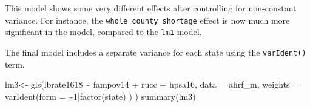 \documentclass[
  letterpaper,
  DIV=11,
  numbers=noendperiod]{scrreprt}
\newenvironment{Shaded}{\begin{snugshade}}{\end{snugshade}}
\newcommand{\AttributeTok}[1]{\textcolor[rgb]{0.40,0.45,0.13}{#1}}
\newcommand{\DecValTok}[1]{\textcolor[rgb]{0.68,0.00,0.00}{#1}}
\newcommand{\FunctionTok}[1]{\textcolor[rgb]{0.28,0.35,0.67}{#1}}
\newcommand{\NormalTok}[1]{\textcolor[rgb]{0.00,0.23,0.31}{#1}}
\newcommand{\OtherTok}[1]{\textcolor[rgb]{0.00,0.23,0.31}{#1}}
\newcommand{\SpecialCharTok}[1]{\textcolor[rgb]{0.37,0.37,0.37}{#1}}
\begin{document}
This model shows some very different effects after controlling for
non-constant variance. For instance, the
\texttt{whole\ county\ shortage} effect is now much more significant in
the model, compared to the \texttt{lm1} model.

The final model includes a separate variance for each state using the
\texttt{varIdent()} term.

\begin{Shaded}
\begin{Highlighting}[]
\NormalTok{lm3}\OtherTok{\textless{}{-}} \FunctionTok{gls}\NormalTok{(lbrate1618 }\SpecialCharTok{\textasciitilde{}}\NormalTok{  fampov14 }\SpecialCharTok{+}\NormalTok{ rucc }\SpecialCharTok{+}\NormalTok{ hpsa16,}
          \AttributeTok{data =}\NormalTok{ ahrf\_m, }
          \AttributeTok{weights =} \FunctionTok{varIdent}\NormalTok{(}\AttributeTok{form =} \SpecialCharTok{\textasciitilde{}}\DecValTok{1}\SpecialCharTok{|}\FunctionTok{factor}\NormalTok{(state) ) )}
\FunctionTok{summary}\NormalTok{(lm3)}
\end{Highlighting}
\end{Shaded}
\end{document}
